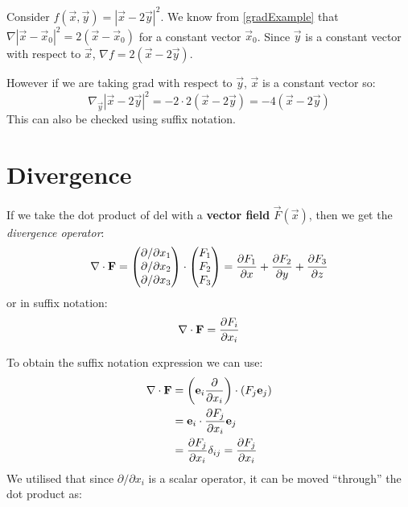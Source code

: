 \documentclass[../main.tex]{subfiles}
\begin{document}
\begin{example}
  Consider $f(\vec{x}, \vec{y}) = |\vec{x} - 2\vec{y}|^2$.
  We know from \cref{gradExample} that $\nabla |\vec{x} - \vec{x}_0|^2 = 2(\vec{x} - \vec{x}_0)$ for a constant vector $\vec{x}_0$.
  Since $\vec{y}$ is a constant vector with respect to $\vec{x}$, $\nabla f = 2(\vec{x} - 2\vec{y})$.

  However if we are taking grad with respect to $\vec{y}$, $\vec{x}$ is a constant vector so:
  \[
    \nabla_{\vec{y}} |\vec{x} - 2\vec{y}|^2 = -2 \cdot 2 (\vec{x} - 2\vec{y}) = -4(\vec{x} - 2\vec{y})
  \]
  This can also be checked using suffix notation.
\end{example}

\section{Divergence}
\label{secDiv}
\begin{definition}[Divergence]
If we take the dot product of del with a \textbf{vector field} $\vec{F}(\vec{x})$, then we get the \textit{divergence operator}:
\[
  \nabla \cdot \vec{F} = \begin{pmatrix}
    \partial/\partial x_1 \\
    \partial/\partial x_2 \\
    \partial/\partial x_3 \\
    \end{pmatrix} \cdot
    \begin{pmatrix}
    F_1 \\
    F_2 \\
    F_3 \\
    \end{pmatrix} =
    \pderiv{F_1}{x} + \pderiv{F_2}{y} + \pderiv{F_3}{z}
\]
or in suffix notation:
\[
  \nabla \cdot \vec{F} = \pderiv{F_i}{x_i}
\]
\end{definition}
To obtain the suffix notation expression we can use:
\begin{align*}
  \nabla \cdot \vec{F} &= \left(\vec{e}_i \pderiv{}{x_i}\right) \cdot (F_j \vec{e}_j) \\
                       &= \vec{e}_i \cdot \pderiv{F_j}{x_i} \vec{e}_j \\
                       &= \pderiv{F_j}{x_i} \delta_{i j} = \pderiv{F_j}{x_i}
\end{align*}
We utilised that since $\partial/\partial x_i$ is a scalar operator, it can be moved ``through'' the dot product as:
\end{document}

